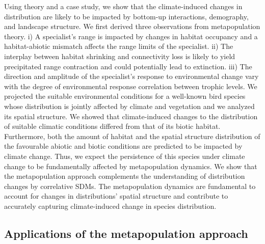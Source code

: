 \documentclass[12pt]{article}
\begin{document}
Using theory and a case study, we show that the climate-induced changes
in distribution are likely to be impacted by bottom-up interactions,
demography, and landscape structure. We first derived three observations
from metapopulation theory. i) A specialist's range is impacted by
changes in habitat occupancy and a habitat-abiotic mismatch affects the
range limits of the specialist. ii) The interplay between habitat
shrinking and connectivity loss is likely to yield precipitated range
contraction and could potentially lead to extinction. iii) The direction
and amplitude of the specialist's response to environmental change vary
with the degree of environmental response correlation between trophic
levels. We projected the suitable environmental conditions for a
well-known bird species whose distribution is jointly affected by
climate and vegetation and we analyzed its spatial structure. We showed
that climate-induced changes to the distribution of suitable climatic
conditions differed from that of its biotic habitat. Furthermore, both
the amount of habitat and the spatial structure distribution of the
favourable abiotic and biotic conditions are predicted to be impacted by
climate change. Thus, we expect the persistence of this species under
climate change to be fundamentally affected by metapopulation dynamics.
We show that the metapopulation approach complements the understanding
of distribution changes by correlative SDMs. The metapopulation dynamics
are fundamental to account for changes in distributions' spatial
structure and contribute to accurately capturing climate-induced change
in species distribution.

\hypertarget{applications-of-the-metapopulation-approach}{%
\subsection{Applications of the metapopulation
approach}\label{applications-of-the-metapopulation-approach}}
\end{document}
